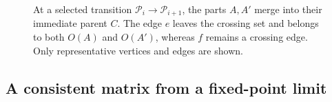 \documentclass[11pt]{amsart}
\theoremstyle{definition}
\theoremstyle{remark}
\numberwithin{equation}{section}
\begin{document}
\begin{figure}[tbp]
  \endgroup
  \caption{At a selected transition $\mathcal P_i\to\mathcal P_{i+1}$,
    the parts $A,A'$ merge into their immediate parent $C$.
    The edge $e$ leaves the crossing set and belongs to both $O(A)$ and
    $O(A')$, whereas $f$ remains a crossing edge.
    Only representative vertices and edges are shown.}
  \label{fig:hierarchy}
\end{figure}


\subsection{A consistent matrix from a fixed-point limit}
\end{document}
